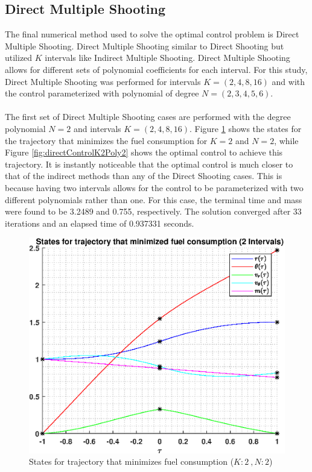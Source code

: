 \documentclass[]{article}
\begin{document}
\subsection{Direct Multiple Shooting}
The final numerical method used to solve the optimal control problem is Direct Multiple Shooting. Direct Multiple Shooting similar to Direct Shooting but utilized \(K\) intervals like Indirect Multiple Shooting. Direct Multiple Shooting allows for different sets of polynomial coefficients for each interval. For this study, Direct Multiple Shooting was performed for intervals \(K = (2,4,8,16)\) and with the control parameterized with polynomial of degree \(N = (2,3,4,5,6)\).
\\
\\
The first set of Direct Multiple Shooting cases are performed with the degree polynomial \(N = 2\) and intervals \(K = (2,4,8,16)\). Figure \ref{fig:directStatesK2Poly2} shows the states for the trajectory that minimizes the fuel consumption for \(K = 2\) and  \(N = 2\), while Figure \ref{fig:directControlK2Poly2} shows the optimal control to achieve this trajectory. It is instantly noticeable that the optimal control is much closer to that of the indirect methods than any of the Direct Shooting cases. This is because having two intervals allows for the control to be parameterized with two different polynomials rather than one. For this case, the terminal time and mass were found to be 3.2489 and 0.755, respectively. The solution converged after 33 iterations and an elapsed time of 0.937331 seconds.
\begin{figure}
	\centering
	\includegraphics[scale=0.75]{directStatesK2Poly2.eps}
	\caption{States for trajectory that minimizes fuel consumption (\(K:2\ , N:2\))}
	\label{fig:directStatesK2Poly2}
\end{figure}
\end{document}

